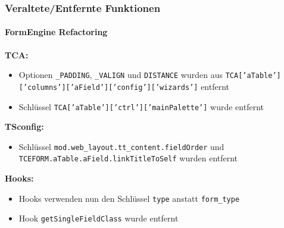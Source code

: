 \begin{frame}[fragile]
	\frametitle{Veraltete/Entfernte Funktionen}
	\framesubtitle{FormEngine Refactoring}

		\textbf{TCA:}

			\small
			\begin{itemize}

				\item Optionen \texttt{\_PADDING}, \texttt{\_VALIGN} und \texttt{DISTANCE}
					wurden aus \texttt{TCA['aTable']['columns']['aField']['config']['wizards']}
					entfernt

				\item Schlüssel \texttt{TCA['aTable']['ctrl']['mainPalette']} wurde entfernt

			\end{itemize}

		\textbf{TSconfig:}

			\small
			\begin{itemize}
				\item Schlüssel \texttt{mod.web\_layout.tt\_content.fieldOrder} und
					\texttt{TCEFORM.aTable.aField.linkTitleToSelf} wurden entfernt
			\end{itemize}

		\textbf{Hooks:}

			\small
			\begin{itemize}
				\item Hooks verwenden nun den Schlüssel \texttt{type} anstatt \texttt{form\_type}
				\item Hook \texttt{getSingleFieldClass} wurde entfernt
			\end{itemize}

\end{frame}


